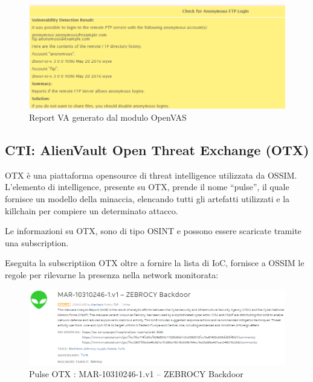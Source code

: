   \begin{figure}[h]
            \begin{center}
                \includegraphics[width=0.98\columnwidth]{images/4_caso_d'uso_img/openVAsReport.png}
            \end{center}
            \caption{Report VA generato dal modulo OpenVAS}
            \label{fig:Report VA generato dal modulo OpenVAS}
        \end{figure}
        
\newpage

\subsection{CTI: AlienVault Open Threat Exchange (OTX)}

OTX è una piattaforma opensource di threat intelligence utilizzata da OSSIM.
L’elemento di intelligence, presente su OTX, prende il nome “pulse”, il quale fornisce un modello della minaccia, elencando tutti gli artefatti utilizzati e la killchain per compiere un determinato attacco.\par
Le informazioni su OTX, sono di tipo OSINT e possono essere scaricate tramite una subscription.\par Eseguita la subscriptiion OTX oltre a fornire la lista di IoC, fornisce a OSSIM le regole per rilevarne la presenza nella network monitorata: 

  \begin{figure}[h]
            \begin{center}
                \includegraphics[width=0.98\columnwidth]{images/4_caso_d'uso_img/OTXpulse.png}
            \end{center}
            \caption{Pulse OTX : MAR-10310246-1.v1 – ZEBROCY Backdoor}
            \label{fig:Pulse OTX : MAR-10310246-1.v1 – ZEBROCY Backdoor}
        \end{figure}



